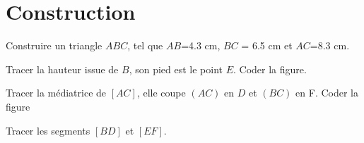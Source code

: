 \section{Construction}

\begin{questions}
	\question Construire un triangle $ABC$, tel que $AB$=\num{4.3} cm, $BC$ = \num{6.5} cm et $AC$=\num{8.3} cm.
	
	\question Tracer la hauteur issue de $B$, son pied est le point $E$. Coder la figure.
	
	\question Tracer la médiatrice de $[AC]$, elle coupe $(AC)$ en $D$ et $(BC)$ en F. Coder la figure
	
	\question Tracer les segments $[BD]$ et $[EF]$. 
\end{questions}
  